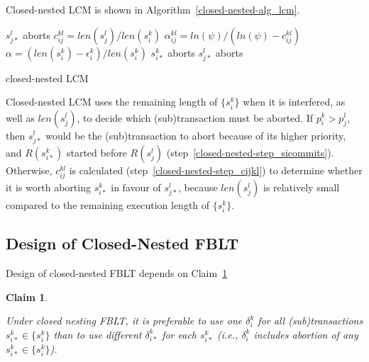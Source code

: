 \documentclass[10pt, conference, compsocconf]{IEEEtran}
\newtheorem{clm}{Claim}
\begin{document}
Closed-nested LCM is shown in Algorithm~\ref{closed-nested-alg_lcm}. 
%
\begin{algorithm}[!htpd]
\footnotesize{
\LinesNumbered
{}
	{$s_{j*}^l$ aborts\label{closed-nested-step_sicommits}\;}
	{$c_{ij}^{kl}=len(s_j^l)/len(s_i^k)$\label{closed-nested-step_cijkl}\;
	$\alpha_{ij}^{kl}=ln(\psi)/(ln(\psi)-c_{ij}^{kl})$\label{closed-nested-step_alphaijkl}\;
	$\alpha=\left(len(s_i^k)-\epsilon_i^k\right)/len(s_i^k)$\;
	{$s_{i*}^k$ aborts\label{closed-nested-step_siaborts}\;}
	{$s_{j*}^l$ aborts\label{closed-nested-step_sjaborts}\;}
	}
	}
\caption{closed-nested LCM}
\label{closed-nested-alg_lcm}
\end{algorithm}
%
Closed-nested LCM uses the remaining length of $\{s_{i}^{k}\}$ when it is interfered,
as well as $len(s_{j}^{l})$, to decide which (sub)transaction must be aborted. If $p_i^k > p_j^l$, then $s_{j*}^l$ would be the (sub)transaction to abort because of its higher priority, and $R(s_{i*}^k)$ started before $R(s_j^l)$ (step~\ref{closed-nested-step_sicommits}). Otherwise, $c_{ij}^{kl}$ is calculated (step~\ref{closed-nested-step_cijkl}) to determine whether it is worth aborting $s_{i*}^k$ in favour of $s_{j*}^l$, because $len(s_j^l)$ is relatively small compared to the remaining execution length of $\{s_i^k\}$.

\subsection{Design of Closed-Nested FBLT}

Design of closed-nested FBLT depends on Claim~\ref{closed_nesting_fblt_one_delta}
%
\begin{clm}\label{closed_nesting_fblt_one_delta}

Under closed nesting FBLT, it is preferable to use one $\delta_{i}^{k}$
for all (sub)transactions $s_{i*}^{k}\in\{s_{i}^{k}\}$ than to use
different $\delta_{i*}^{k}$ for each $s_{i*}^{k}$ (i.e., $\delta_{i}^{k}$
includes abortion of any $s_{i*}^{k}\in\{s_{i}^{k}\}$).

\end{clm}
\end{document}
